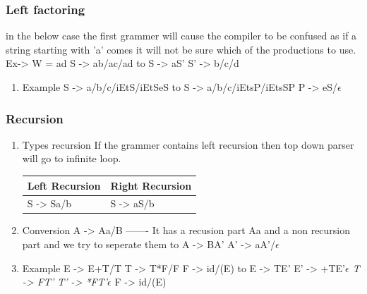 \documentclass[11pt]{article}
\begin{document}
\subsubsection{Left factoring}
\label{sec:org1e05d5e}
in the below case the first grammer will cause the compiler to be confused as if a string starting with 'a' comes it will not be sure which of the productions to use.
Ex-> W = ad
S -> ab/ac/ad
to
S -> aS'
S' -> b/c/d
\begin{enumerate}
\item Example
\label{sec:orge707cdd}
S -> a/b/c/iEtS/iEtSeS
to
S -> a/b/c/iEtsP/iEtsSP
P -> eS/\(\epsilon\)
\end{enumerate}
\subsubsection{Recursion}
\label{sec:org41fa57f}
\begin{enumerate}
\item Types recursion
\label{sec:org764c127}
If the grammer contains left recursion then top down parser will go to infinite loop.
\begin{center}
\begin{tabular}{ll}
\hline
Left Recursion & Right Recursion\\[0pt]
\hline
S -> Sa/b & S -> aS/b\\[0pt]
\hline
\end{tabular}
\end{center}
\item Conversion
\label{sec:orgcce62db}
A -> Aa/B  ------- It has a recusion part Aa and a non recursion part and we try to seperate them
to
A -> BA'
A' -> aA'/\(\epsilon\)
\item Example
\label{sec:orgd814801}
E -> E+T/T
T -> T*F/F
F -> id/(E)
to
E -> TE'
E' -> +TE'\emph{\(\epsilon\)
T -> FT'
T' -> *FT'}\(\epsilon\)
F -> id/(E)
\end{enumerate}
\end{document}
